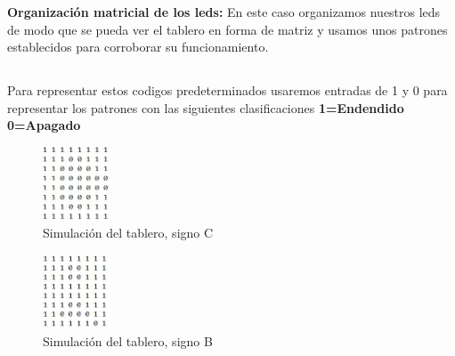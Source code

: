 \documentclass{article}
\begin{document}
\vspace*{2cm}

\textbf{Organización matricial de los leds: }
En este caso organizamos nuestros leds de modo que se pueda ver el tablero en forma de matriz y usamos unos patrones establecidos para corroborar su funcionamiento. 

\newpage

\subsection{}
Para representar estos codigos predeterminados usaremos entradas de 1 y 0 para representar los patrones con las siguientes clasificaciones
\textbf{1=Endendido}
\textbf{0=Apagado}

\begin{figure}[h]
\includegraphics[width=2cm]{imagenC.jpeg}
\caption{Simulación del tablero, signo C}
\label{fig:imagenC}
\end{figure}

\begin{figure}[h]
\includegraphics[width=2cm]{imagenB.jpeg}
\caption{Simulación del tablero, signo B}
\label{fig:imagenB}
\end{figure}
\end{document}
